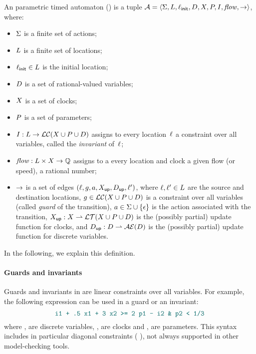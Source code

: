 \begin{definition}[\IPTA{}]\label{definition:IPTA}
	An \imitator{} parametric timed automaton (\emph{\IPTA{}}) is a tuple $\mathcal{A} = \langle\Sigma, L, \ell_{\textsf{init}}, D, X, P, I, \mathit{flow}, {\rightarrow}\rangle$, where:
	\begin{itemize}
		\item $\Sigma$ is a finite set of actions;
		\item $L$ is a finite set of locations;
		\item $\ell_{\textsf{init}} \in L$ is the initial location;
		\item $D$ is a set of rational-valued variables;
		\item $X$ is a set of clocks;
		\item $P$ is a set of parameters;
		\item $I : L \rightarrow \mathcal{LC}(X \cup P \cup D)$ assigns to every location~$\ell$ a constraint over all variables, called the \emph{invariant} of~$\ell$;
		\item $\mathit{flow} : L \times X \rightarrow {\mathbb Q}$ assigns to a every location and clock a given flow (or speed), \ie{} a rational number;
		\item ${\rightarrow}$ is a set of edges $(\ell, g, a, X_\mathsf{up}, D_\mathsf{up}, \ell')$, where
		      $\ell, \ell' \in L$ are the source and destination locations,
		      $g \in \mathcal{LC}(X \cup P \cup D)$ is a constraint over all variables (called \emph{guard} of the transition),
		      $a \in \Sigma \cup \{ \epsilon \}$ is the action associated with the transition,
		      $X_\mathsf{up} : X \rightharpoonup \mathcal{LT}(X \cup P \cup D)$ is the (possibly partial) update function for clocks, and
		      $D_\mathsf{up} : D \rightharpoonup \mathcal{AE}(D)$ is the (possibly partial) update function for discrete variables.
	\end{itemize}
\end{definition}

In the following, we explain this definition.

\paragraph{Guards and invariants}
Guards and invariants in \imitator{} are linear constraints over all variables.
For example, the following expression can be used in a guard or an invariant:
$$ \styleIMI{i1 + .5 x1 + 3 x2 >= 2 p1 - i2 \& p2 < 1/3} $$
where ,  are discrete variables, ,  are clocks and ,  are parameters.
This syntax includes in particular diagonal constraints (\eg{} ), not always supported in other model-checking tools.

